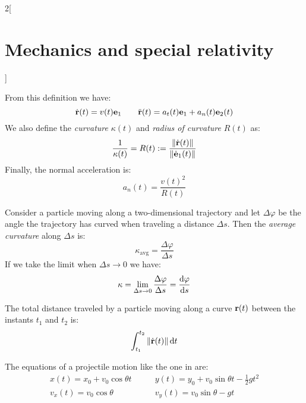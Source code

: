 \documentclass[../../../main_physics.tex]{subfiles}
\begin{document}
\begin{multicols}{2}[\section{Mechanics and special relativity}]
\begin{definition}
    From this definition we have: $$\dot{\boldsymbol{\mathrm{r}}}(t)=v(t)\boldsymbol{\mathrm{e}}_1\qquad\ddot{\boldsymbol{\mathrm{r}}}(t)=a_t(t)\boldsymbol{\mathrm{e}}_1+a_n(t)\boldsymbol{\mathrm{e}}_2(t)$$ We also define the \emph{curvature} $\kappa(t)$ and \emph{radius of curvature} $R(t)$ as: $$\frac{1}{\kappa(t)}=R(t):=\frac{\|\dot{\boldsymbol{\mathrm{r}}}(t)\|}{\|\dot{\boldsymbol{\mathrm{e}}}_1(t)\|}$$ Finally, the normal acceleration is: $$a_n(t)=\frac{v(t)^2}{R(t)}$$
  \end{definition}
  \begin{proposition}[Curvature]
    Consider a particle moving along a two-dimensional trajectory and let $\Delta\varphi$ be the angle the trajectory has curved when traveling a distance $\Delta s$. Then the \emph{average curvature} along $\Delta s$ is: $$\kappa_\text{avg}=\frac{\Delta \varphi}{\Delta s}$$ If we take the limit when $\Delta s\to 0$ we have: $$\kappa=\lim_{\Delta s\to 0}\frac{\Delta \varphi}{\Delta s}=\dv{\varphi}{s}$$
  \end{proposition}
  \begin{proposition}
    The total distance traveled by a particle moving along a curve $\boldsymbol{\mathrm{r}}(t)$ between the instants $t_1$ and $t_2$ is: $$\int_{t_1}^{t_2}\|\dot{\boldsymbol{\mathrm{r}}}(t)\|\dd{t}$$
  \end{proposition}
  \begin{proposition}
    The equations of a projectile motion like the one in  are:
    \begin{align*}
      x(t)=x_0+v_0\cos\theta t\quad & \quad y(t)=y_0+v_0\sin\theta t-\frac{1}{2}gt^2 \\
      v_x(t)=v_0\cos\theta\quad     & \quad v_y(t)=v_0\sin\theta-gt
    \end{align*}
    \begin{center}
      \begin{minipage}{\linewidth}
        \centering
        
        \label{MSR_projectile}
      \end{minipage}
    \end{center}
  \end{proposition}

\end{multicols}
\end{document}
